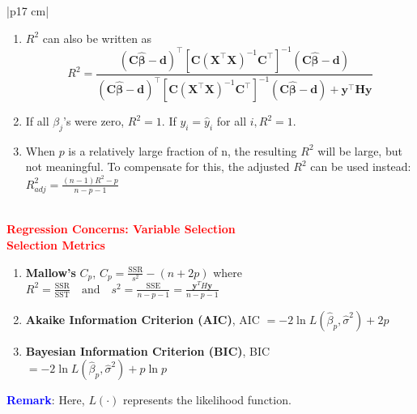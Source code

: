 \documentclass[a4paper,11pt]{article}
\begin{document}
\begin{longtable}{|p{17 cm}|}
\begin{minipage}{\linewidth} 
\vspace{-0.15cm}
\begin{enumerate}
[noitemsep, topsep=0pt]
    \item $R^2$ can also be written as
    \[
    R^2 = \frac{(\mathbf{C} \hat{\boldsymbol{\beta}} - \mathbf{d})^{\top} 
    \left[ \mathbf{C} (\mathbf{X}^{\top} \mathbf{X})^{-1} \mathbf{C}^{\top} \right]^{-1} 
    (\mathbf{C} \hat{\boldsymbol{\beta}} - \mathbf{d})}{(\mathbf{C} \hat{\boldsymbol{\beta}} - \mathbf{d})^{\top} 
    \left[ \mathbf{C} (\mathbf{X}^{\top} \mathbf{X})^{-1} \mathbf{C}^{\top} \right]^{-1} 
    (\mathbf{C} \hat{\boldsymbol{\beta}} - \mathbf{d})+\mathbf{y}^{\top}\textbf{H}\mathbf{y}}
    \]
    \item If all $\beta_j$'s were zero, $R^2=1$. If $y_i=\hat{y}_i$ for all $i, R^2=1$.
    \item When $p$ is a relatively large fraction of n, the resulting $R^2$ will be large, but not meaningful. To compensate for this, the adjusted $R^2$ can be used instead:
    \(
    R_{adj}^2=\frac{(n-1)R^2-p}{n-p-1}
    \)
\end{enumerate}
\end{minipage} \\

\hline
\textbf{\textcolor{red}{Regression Concerns: Variable Selection}} \\
\textbf{\textcolor{red}{Selection Metrics}}
\begin{enumerate}
[noitemsep, topsep=0pt]
    \item \textbf{Mallow’s } $C_p$, $C_p = \frac{\text{SSR}}{s^2} - (n + 2p)$ where $R^2 = \frac{\text{SSR}}{\text{SST}} \quad \text{and} \quad s^2 = \frac{\text{SSE}}{n - p - 1} = \frac{\boldsymbol{y}^T H \boldsymbol{y}}{n - p - 1}$
    \item \textbf{Akaike Information Criterion (AIC)}, AIC $=-2\ln{L(\hat{\beta}_p,\hat{\sigma}^2)}+2p$
    \item \textbf{Bayesian Information Criterion (BIC)}, BIC $=-2\ln{L(\hat{\beta}_p,\hat{\sigma}^2)}+p\ln{p}$
\end{enumerate}
\textbf{\textcolor{blue}{Remark}}: Here, $L(\cdot)$ represents the likelihood function. \\


\end{longtable}
\end{document}
